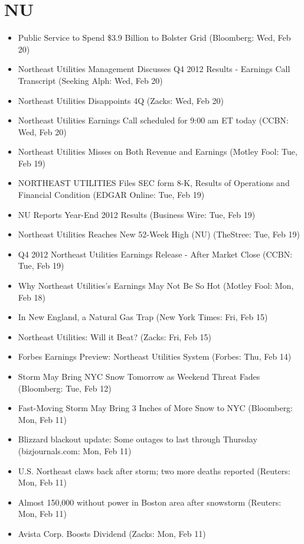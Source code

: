 \documentclass[11pt,asymmetric]{article}
\begin{document}
\section*{NU}
\begin{itemize}
\item Public Service to Spend \$3.9 Billion to Bolster Grid (Bloomberg: Wed, Feb 20)
\item Northeast Utilities Management Discusses Q4 2012 Results - Earnings Call Transcript (Seeking Alph: Wed, Feb 20)
\item Northeast Utilities Disappoints 4Q (Zacks: Wed, Feb 20)
\item Northeast Utilities Earnings Call scheduled for 9:00 am ET today (CCBN: Wed, Feb 20)
\item Northeast Utilities Misses on Both Revenue and Earnings (Motley Fool: Tue, Feb 19)
\item NORTHEAST UTILITIES Files SEC form 8-K, Results of Operations and Financial Condition (EDGAR Online: Tue, Feb 19)
\item NU Reports Year-End 2012 Results (Business Wire: Tue, Feb 19)
\item Northeast Utilities Reaches New 52-Week High (NU) (TheStree: Tue, Feb 19)
\item Q4 2012 Northeast Utilities Earnings Release - After Market Close (CCBN: Tue, Feb 19)
\item Why Northeast Utilities's Earnings May Not Be So Hot (Motley Fool: Mon, Feb 18)
\item In New England, a Natural Gas Trap (New York Times: Fri, Feb 15)
\item Northeast Utilities: Will it Beat? (Zacks: Fri, Feb 15)
\item Forbes Earnings Preview: Northeast Utilities System (Forbes: Thu, Feb 14)
\item Storm May Bring NYC Snow Tomorrow as Weekend Threat Fades (Bloomberg: Tue, Feb 12)
\item Fast-Moving Storm May Bring 3 Inches of More Snow to NYC (Bloomberg: Mon, Feb 11)
\item Blizzard blackout update: Some outages to last through Thursday (bizjournals.com: Mon, Feb 11)
\item U.S. Northeast claws back after storm; two more deaths reported (Reuters: Mon, Feb 11)
\item Almost 150,000 without power in Boston area after snowstorm (Reuters: Mon, Feb 11)
\item Avista Corp. Boosts Dividend (Zacks: Mon, Feb 11)

\end{itemize}
\end{document}
